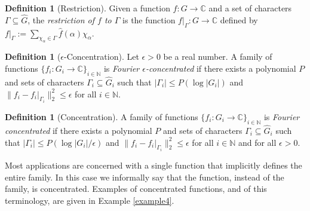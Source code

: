 \documentclass[11pt]{article}
\theoremstyle{definition}
\newtheorem{definition}[theorem]{Definition}
\newcommand{\N}{\mathbb{N}}
\newcommand{\Z}{\mathbb{Z}}
\newcommand{\C}{\mathbb{C}}
\newcommand{\famly}{\mathscr{J}}
\begin{document}
\begin{definition} [Restriction]
    Given a function $f:G \rightarrow \C$ and a set of characters $\Gamma \subseteq \widehat{G}$, the \emph{restriction of $f$ to $\Gamma$} is the function $f|_\Gamma: G \rightarrow \C$ defined by $f|_\Gamma := \sum_{\chi_\alpha \in \Gamma}\widehat{f}(\alpha) \chi_\alpha$.
\end{definition}


\begin{definition} [$\epsilon$-Concentration]
    Let $\epsilon>0$ be a real number. A family of functions $\{f_i:G_i\to \C\}_{i\in \N}$ is \emph{Fourier $\epsilon$-concentrated} if there exists a polynomial $P$ and sets of characters $\Gamma_i \subseteq \widehat{G}_i$ such that $|\Gamma_i| \le P( \log|G_i| )$ and $\| f_i - f_i|_{\Gamma_i} \|_{2}^{2} \leq \epsilon$ for all $i\in \N$.
\end{definition}

\begin{definition} [Concentration]
    A family of functions $\{f_i:G_i\to \C\}_{i\in \N}$ is \emph{Fourier concentrated} if there exists a polynomial $P$ and sets of characters $\Gamma_i \subseteq \widehat{G}_i$ such that $|\Gamma_i| \le P( \log|G_i|/\epsilon )$ and $\| f_i - f_i|_{\Gamma_i} \|_{2}^{2} \leq \epsilon$ for all $i\in \N$ and for all $\epsilon > 0$.
\end{definition}


Most applications are concerned with a single function that implicitly defines the entire family. In this case we informally say that the function, instead of the family, is concentrated. Examples of concentrated functions, and of this terminology, are given in Example \ref{example4}.
\end{document}
